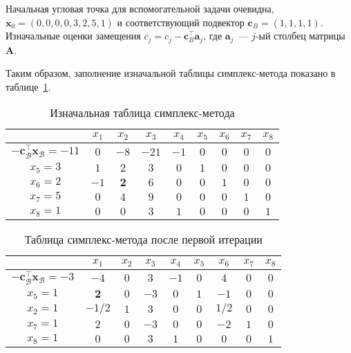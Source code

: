 \documentclass[12pt]{article}
\newcommand{\bx}{\mathbf{x}}
\newcommand{\bc}{\mathbf{c}}
\newcommand{\ba}{\mathbf{a}}
\newcommand{\bA}{\mathbf{A}}
\begin{document}
Начальная угловая точка для вспомогательной задачи очевидна, $\bx_0 = (0,0,0,0, 3, 2, 5, 1)$ и соответствующий подвектор $\bc_{B} = (1,1,1,1)$.
Изначальные оценки замещения $\overline{c}_j = c_j - \bc^{\top}_B \ba_j$, где $\ba_j$~--- $j$-ый столбец матрицы $\bA$.

Таким образом, заполнение изначальной таблицы симплекс-метода показано в таблице~\ref{tab::simplex_30}.

\begin{table}[!ht]
\centering
\caption{Изначальная таблица симплекс-метода}
\begin{tabular}{|c|cccccccc|}
\hline
& $x_1$ & $x_2$ & $x_3$ & $x_4$ & $x_5$ & $x_6$ & $x_7$ & $x_8$\\
\hline
$-\mathbf{c}_{\mathcal{B}}^{\top}\bx_{\mathcal{B}} = -11$ & $0$ & $-8$ & $-21$ & $-1$ & $0$ & $0$ & $0$ & $0$ \\
\hline
$x_5 = 3$ & $1$ & $2$ & $3$ & $0$ & $1$ & $0$ & $0$ & $0$ \\
$x_6 = 2$ & $-1$ & $\mathbf{2}$ & $6$ & $0$ & $0$ & $1$ & $0$ & $0$ \\
$x_7 = 5$ & $0$ & $4$ & $9$ & $0$ & $0$ & $0$ & $1$ & $0$ \\
$x_8 = 1$ & $0$ & $0$ & $3$ & $1$ & $0$ & $0$ & $0$ & $1$\\
\hline
\end{tabular}
\label{tab::simplex_30}
\end{table}

\begin{table}[!ht]
\centering
\caption{Таблица симплекс-метода после первой итерации}
\begin{tabular}{|c|cccccccc|}
\hline
& $x_1$ & $x_2$ & $x_3$ & $x_4$ & $x_5$ & $x_6$ & $x_7$ & $x_8$\\
\hline
$-\mathbf{c}_{\mathcal{B}}^{\top}\bx_{\mathcal{B}} = -3$ & $-4$ & $0$ & $3$ & $-1$ & $0$ & $4$ & $0$ & $0$ \\
\hline
$x_5 = 1$ & $\mathbf{2}$ & $0$ & $-3$ & $0$ & $1$ & $-1$ & $0$ & $0$ \\
$x_2 = 1$ & $-1/2$ & $1$ & $3$ & $0$ & $0$ & $1/2$ & $0$ & $0$ \\
$x_7 = 1$ & $2$ & $0$ & $-3$ & $0$ & $0$ & $-2$ & $1$ & $0$ \\
$x_8 = 1$ & $0$ & $0$ & $3$ & $1$ & $0$ & $0$ & $0$ & $1$\\
\hline
\end{tabular}
\label{tab::simplex_31}
\end{table}
\end{document}
